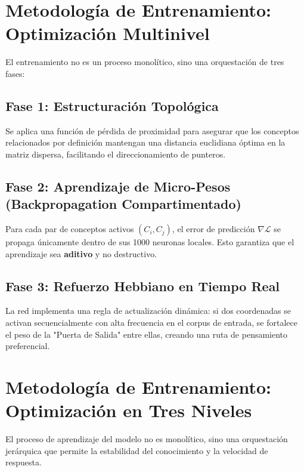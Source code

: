 \documentclass[12pt]{article}
\begin{document}
\section{Metodología de Entrenamiento: Optimización Multinivel}
El entrenamiento no es un proceso monolítico, sino una orquestación de tres fases:

\subsection{Fase 1: Estructuración Topológica}
Se aplica una función de pérdida de proximidad para asegurar que los conceptos relacionados por definición mantengan una distancia euclidiana óptima en la matriz dispersa, facilitando el direccionamiento de punteros.

\subsection{Fase 2: Aprendizaje de Micro-Pesos (Backpropagation Compartimentado)}
Para cada par de conceptos activos $(C_i, C_j)$, el error de predicción $\nabla \mathcal{L}$ se propaga únicamente dentro de sus 1000 neuronas locales. Esto garantiza que el aprendizaje sea \textbf{aditivo} y no destructivo.

\subsection{Fase 3: Refuerzo Hebbiano en Tiempo Real}
La red implementa una regla de actualización dinámica: si dos coordenadas se activan secuencialmente con alta frecuencia en el corpus de entrada, se fortalece el peso de la "Puerta de Salida" entre ellas, creando una ruta de pensamiento preferencial.



\section{Metodología de Entrenamiento: Optimización en Tres Niveles}

El proceso de aprendizaje del modelo no es monolítico, sino una orquestación jerárquica que permite la estabilidad del conocimiento y la velocidad de respuesta.
\end{document}
